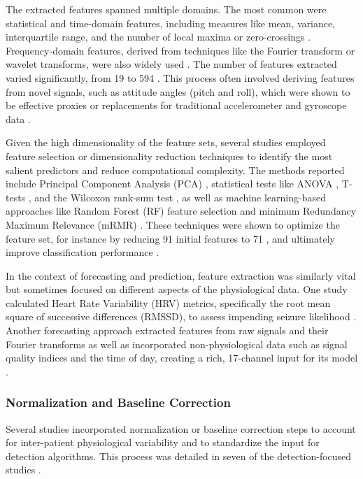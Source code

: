 The extracted features spanned multiple domains. The most common were statistical and time-domain features, including measures like mean, variance, interquartile range, and the number of local maxima or zero-crossings \cite{Milosevic2016-ee, De_Cooman2018-pq, Dong2022-oo, Wang2025-my}. Frequency-domain features, derived from techniques like the Fourier transform or wavelet transforms, were also widely used \cite{Poh2012-af, Chowdhury2022-bi, De_Cooman2018-pq, Vakilna2024-hk}. The number of features extracted varied significantly, from 19 \cite{Poh2012-af} to 594 \cite{Larsen2024-vn}. This process often involved deriving features from novel signals, such as attitude angles (pitch and roll), which were shown to be effective proxies or replacements for traditional accelerometer and gyroscope data \cite{Wang2025-ql}.

Given the high dimensionality of the feature sets, several studies employed feature selection or dimensionality reduction techniques to identify the most salient predictors and reduce computational complexity. The methods reported include Principal Component Analysis (PCA) \cite{Chowdhury2022-bi}, statistical tests like ANOVA \cite{Dong2022-oo}, T-tests \cite{Ge2023-ab}, and the Wilcoxon rank-sum test \cite{Vakilna2024-hk}, as well as machine learning-based approaches like Random Forest (RF) feature selection \cite{Xu2022-tx} and minimum Redundancy Maximum Relevance (mRMR) \cite{Ge2023-ab}. These techniques were shown to optimize the feature set, for instance by reducing 91 initial features to 71 \cite{Xu2022-tx}, and ultimately improve classification performance \cite{Ge2023-ab}.

In the context of forecasting and prediction, feature extraction was similarly vital but sometimes focused on different aspects of the physiological data. One study calculated Heart Rate Variability (HRV) metrics, specifically the root mean square of successive differences (RMSSD), to assess impending seizure likelihood \cite{Vieluf2023-zv}. Another forecasting approach extracted features from raw signals and their Fourier transforms as well as incorporated non-physiological data such as signal quality indices and the time of day, creating a rich, 17-channel input for its model \cite{Meisel2020-ii}.


\subsubsection{Normalization and Baseline Correction}
Several studies incorporated normalization or baseline correction steps to account for inter-patient physiological variability and to standardize the input for detection algorithms. This process was detailed in seven of the detection-focused studies \cite{Nasseri2021-xn, Jiang2022-zu, Hegarty-Craver2021-hk, Cogan2017-lg, Ge2023-ab, Milosevic2016-ee, Wang2025-ql}.

